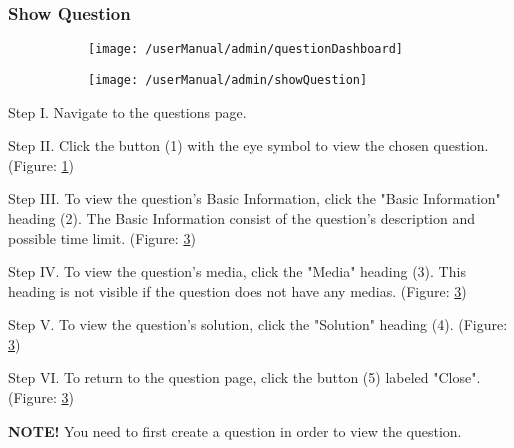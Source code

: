 \subsubsection{Show Question}

\begin{figure}[H]
	\begin{subfigure}{0.80\linewidth}
		\texttt{[image: /userManual/admin/questionDashboard]}
		\caption{}
		\label{fig:questionDashboardShowQuestion}
	\end{subfigure}
	\begin{subfigure}{0.70\linewidth}
		\texttt{[image: /userManual/admin/showQuestion]}
		\caption{}
		\label{fig:showQuestion}
	\end{subfigure}
\end{figure}

\begin{userManualItemlist}
	\item[Step I.] Navigate to the questions page.
	\item[Step II.] Click the button (1) with the eye symbol to view the chosen question. (Figure: \ref{fig:questionDashboardShowQuestion})
	\item[Step III.] To view the question's Basic Information, click the "Basic Information" heading (2). The Basic Information consist of the question's description and possible time limit. (Figure: \ref{fig:showQuestion})
	\item[Step IV.] To view the question's media, click the "Media" heading (3). This heading is not visible if the question does not have any medias. (Figure: \ref{fig:showQuestion})
	\item[Step V.] To view the question's solution, click the "Solution" heading (4). (Figure: \ref{fig:showQuestion})
	\item[Step VI.] To return to the question page, click the button (5) labeled "Close". (Figure: \ref{fig:showQuestion}) 
\end{userManualItemlist}
\textbf{NOTE!} You need to first create a question in order to view the question.